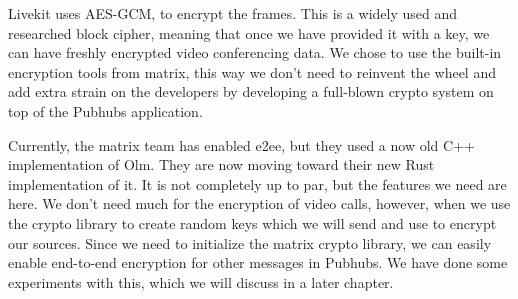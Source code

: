 \documentclass{report}
\begin{document}
    Livekit uses AES-GCM, to encrypt the frames. This is a widely used and researched block cipher, meaning that once we
    have provided it with a key, we can have freshly encrypted video conferencing data. We chose to use the built-in
    encryption tools from matrix, this way we don't need to reinvent the wheel and add extra strain on the developers by
    developing a full-blown crypto system on top of the Pubhubs application.

    Currently, the matrix team has enabled e2ee, but they used a now old C++ implementation of Olm. They are now moving
    toward their new Rust implementation of it. It is not completely up to par, but the features we need are here. We
    don't need much for the encryption of video calls, however, when we use the crypto library to create random keys
    which we will send and use to encrypt our sources. Since we need to initialize the matrix crypto library, we can
    easily enable end-to-end encryption for other messages in Pubhubs. We have done some experiments with this,
    which we will discuss in a later chapter.





\end{document}
